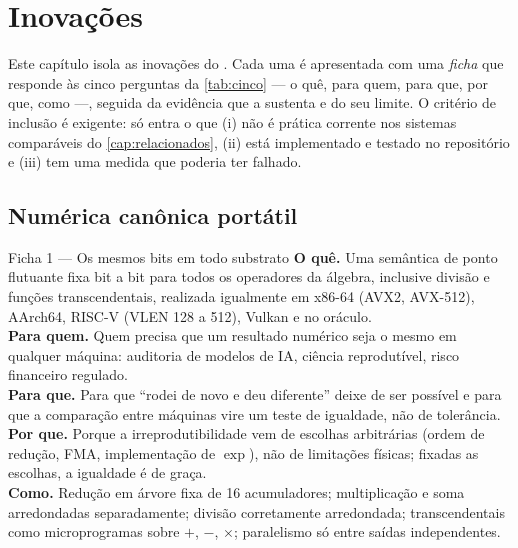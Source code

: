 \chapter{Inovações}\label{cap:inovacoes}

Este capítulo isola as inovações do \vapor{}. Cada uma é apresentada com uma \emph{ficha} que responde às cinco perguntas da \autoref{tab:cinco} --- o quê, para quem, para que, por que, como ---, seguida da evidência que a sustenta e do seu limite. O critério de inclusão é exigente: só entra o que (i) não é prática corrente nos sistemas comparáveis do \autoref{cap:relacionados}, (ii) está implementado e testado no repositório e (iii) tem uma medida que poderia ter falhado.

\section{Numérica canônica portátil}\label{sec:inov-canonica}

\begin{ficha}{Ficha 1 --- Os mesmos bits em todo substrato}
\textbf{O quê.} Uma semântica de ponto flutuante fixa bit a bit para todos os operadores da álgebra, inclusive divisão e funções transcendentais, realizada igualmente em x86-64 (AVX2, AVX-512), AArch64, RISC-V (VLEN 128 a 512), Vulkan e no oráculo.\\
\textbf{Para quem.} Quem precisa que um resultado numérico seja o mesmo em qualquer máquina: auditoria de modelos de IA, ciência reprodutível, risco financeiro regulado.\\
\textbf{Para que.} Para que ``rodei de novo e deu diferente'' deixe de ser possível e para que a comparação entre máquinas vire um teste de igualdade, não de tolerância.\\
\textbf{Por que.} Porque a irreprodutibilidade vem de escolhas arbitrárias (ordem de redução, FMA, implementação de $\exp$), não de limitações físicas; fixadas as escolhas, a igualdade é de graça.\\
\textbf{Como.} Redução em árvore fixa de 16 acumuladores; multiplicação e soma arredondadas separadamente; divisão corretamente arredondada; transcendentais como microprogramas sobre $+$, $-$, $\times$; paralelismo só entre saídas independentes.
\end{ficha}

